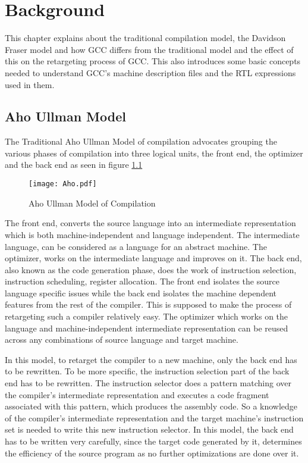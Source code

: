 \chapter{Background}
This chapter explains about the traditional compilation model, the Davidson Fraser model and how GCC differs from the traditional 
model and the effect of this on the retargeting process of GCC. This also introduces some basic concepts needed to understand
GCC's machine description files and the RTL expressions used in them.

\section{Aho Ullman Model}
The Traditional Aho Ullman Model of compilation\cite{Aho} advocates grouping the various phases of compilation into three logical units,
the front end, the optimizer and the back end as seen in figure \ref{fig:FigureAho}


\begin{figure}[htb!]
\centering%
\texttt{[image: Aho.pdf]}
\caption{Aho Ullman Model of Compilation}
\label{fig:FigureAho}
\end{figure}

		    The front end, converts the source language into an intermediate representation which is both machine-independent and language 
independent. The intermediate language, can be considered as a language for an abstract machine. The optimizer, works on the 
intermediate language and improves on it. The back end, also known as the code generation phase, does the work of instruction 
selection, instruction scheduling, register allocation. The front end isolates the source language specific issues while the 
back end isolates the machine dependent features from the rest of the compiler. This is supposed to make the process of retargeting such a compiler 
relatively easy. The optimizer which works on the language and machine-independent intermediate representation can be reused
across any combinations of source language and target machine. 

				  In this model, to retarget the compiler to a new machine, only the back end has to be rewritten. To be more specific, the instruction
selection part of the back end has to be rewritten. The instruction selector does a pattern matching over the compiler's
intermediate representation and executes a code fragment associated with this pattern, which produces the assembly code. So a 
knowledge of the compiler's intermediate representation and the target machine's instruction set is needed to write this new
instruction selector. In this model, the back end has to be written very carefully, since the target code generated by it, determines the 
efficiency of the source program as no further optimizations are done over it.

